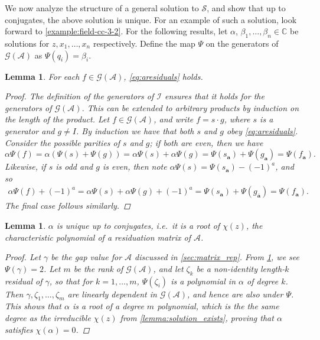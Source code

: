 \documentclass[12pt, letterpaper]{article}
\newcommand{\C}{\mathbb C}
\newcommand{\A}{\mathcal A}
\newcommand{\ch}[1]{\mathbf{#1}}
\newcommand{\res}[2]{{{#1}_{\ch{#2}}}}
\newcommand{\I}{\mathcal I}
\renewcommand{\S}{\mathcal S}
\newcommand{\gp}{\mathcal G}
\newcommand{\f}[1]{\overline{#1}}
\newtheorem{lemma}[thm]{Lemma}
\begin{document}
We now analyze the structure of a general solution to $\S$, and show that up to
conjugates, the above solution is unique. For an example of such a solution,
look forward to \cref{example:field-cc-3-2}.  For the following results, let
$\alpha$, $\beta_1, \ldots, \beta_n \in \C$ be solutions for $z, x_1, \ldots,
x_n$ respectively. Define the map $\Psi$ on the generators of $\gp(\A)$ as
$\Psi(q_i) = \beta_i$.

\begin{lemma}\label{lemma:residuation}
    For each $f \in \gp(\A)$, \cref{eq:aresiduals} holds.
    \begin{proof}
        The definition of the generators of $\I$ ensures that it holds for the
        generators of $\gp(\A)$. This can be extended to arbitrary products by
        induction on the length of the product. Let $f \in \gp(\A)$, and write
        $f = s \cdot g$, where $s$ is a generator and $g \ne I$. By induction
        we have that both $s$ and $g$ obey \cref{eq:aresiduals}.  Consider the
        possible parities of $s$ and $g$; if both are even, then we have
        \[
            \alpha \Psi(f) =
            \alpha (\Psi(s) + \Psi(g)) =
            \alpha \Psi(s) + \alpha \Psi(g) =
            \Psi(\res{s}{a}) + \Psi(\res{g}{a}) = \Psi(\res{f}{a}).
        \]
        Likewise, if $s$ is odd and $g$ is even, then note $\alpha \Psi(s) =
        \Psi(\res{s}{a}) - {(-1)}^a$, and so
        \begin{align*}
            \alpha \Psi(f) + {(-1)}^a =
            \alpha \Psi(s) + \alpha \Psi(g) + {(-1)}^a =
            \Psi(\res{s}{a}) + \Psi(\res{g}{\f{a}}) =
            \Psi(\res{f}{a}).
        \end{align*}
        The final case follows similarly.
    \end{proof}
\end{lemma}


\begin{lemma}\label{lemma:a_unique}
    $\alpha$ is unique up to conjugates, i.e.\ it is a root of $\chi(z)$, the
    characteristic polynomial of a residuation matrix of $\A$.
    \begin{proof}
        Let $\gamma$ be the gap value for $\A$ discussed in
        \cref{sec:matrix_rep}. From \cref{lemma:residuation}, we see
        $\Psi(\gamma) = 2$. Let $m$ be the rank of $\gp(\A)$, and let
        $\zeta_k$ be a non-identity length-$k$ residual of $\gamma$, so that
        for $k = 1, \ldots, m$, $\Psi(\zeta_i)$ is a polynomial in $\alpha$ of
        degree $k$. Then $\gamma, \zeta_1, \ldots, \zeta_{m}$ are linearly
        dependent in $\gp(\A)$, and hence are also under $\Psi$. This shows
        that $\alpha$ is a root of a degree $m$ polynomial, which is the the
        same degree as the irreducible $\chi(z)$ from
        \cref{lemma:solution_exists}, proving that $\alpha$ satisfies
        $\chi(\alpha) = 0$.
    \end{proof}
\end{lemma}
\end{document}
